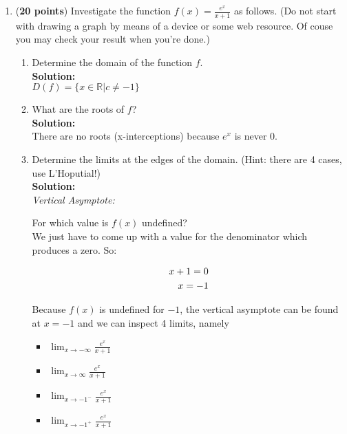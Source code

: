 \documentclass[a4paper]{article}
\begin{document}
\begin{enumerate}


\item (\textbf{20 points}) Investigate the function $f(x) = \frac{e^x}{x+1}$ as follows. (Do not start with drawing a graph by means of a device or some web resource. Of couse you may check your result when you're done.)

\begin{enumerate}
	\item Determine the domain of the function $f$.\\
	\textbf{Solution:}\\
	
$D(f) = \{ x \in \mathbb{R} | c \neq -1\}$\\	
	
	
	\item What are the roots of $f$?\\
	\textbf{Solution:}\\

There are no roots (x-interceptions) because $e^x$ is never $0$.\\


	\item Determine the limits at the edges of the domain. (Hint: there are 4 cases, use L'Hoputial!)\\
	\textbf{Solution:}\\
	

\textit{Vertical Asymptote:}	
	
For which value is $f(x)$ undefined?\\
We just have to come up with a value for the denominator which produces a zero. So:	
	
\begin{align}
x + 1 = 0\notag\\
x = -1\notag
\end{align}

Because $f(x)$ is undefined for $-1$, the vertical asymptote can be found at $x = -1$ and we can inspect 4 limits, namely\\

\begin{itemize}
	\item $\lim_{x \to -\infty} \frac{e^x}{x + 1}$
	\item $\lim_{x \to \infty} \frac{e^x}{x + 1}$
	\item $\lim_{x \to -1^{-}} \frac{e^x}{x + 1}$
	\item $\lim_{x \to -1^{+}} \frac{e^x}{x + 1}$
\end{itemize}



\end{enumerate}
\end{enumerate}
\end{document}
